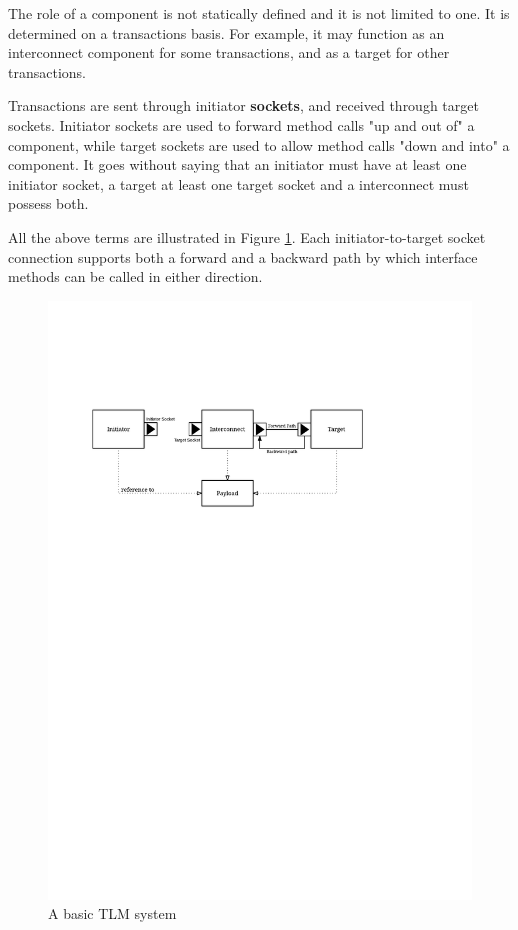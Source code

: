 \documentclass[11pt]{article}
\begin{document}
The role of a component is not statically defined and it is not limited to one.
It is determined on a transactions basis. 
For example, it may function as an interconnect component for some transactions, and as a target for other transactions.

Transactions are sent through initiator \textbf{sockets}, and received through target sockets.
Initiator sockets are used to forward method calls "up and out of" a component, while target sockets are used to allow method calls "down and into" a component.
It goes without saying that an initiator must have at least one initiator socket, a target at least one target socket and a interconnect must possess both.

All the above terms are illustrated in Figure \ref{fig:org1842f09}.
Each initiator-to-target socket connection supports both a forward and a backward path by which interface methods can be called in either direction.

\begin{figure}[htbp]
\centering
\includegraphics[width=.9\linewidth]{Figures/TLMterminology.pdf}
\caption{\label{fig:org1842f09}
A basic TLM system}
\end{figure}
\end{document}
